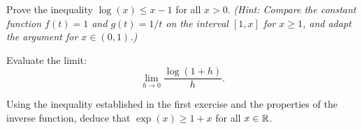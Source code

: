 \documentclass[../analysis1.tex]{subfiles}
\begin{document}
\begin{exercise*}
    Prove the inequality $\log(x) \le x - 1$ for all $x > 0$.
    \textit{(Hint: Compare the constant function $f(t) = 1$ and $g(t) = 1/t$ on the interval $[1, x]$ for $x \ge 1$, and adapt the argument for $x \in (0, 1)$.)}
\end{exercise*}

\begin{exercise*}
    Evaluate the limit:
    \[
        \lim_{h \to 0} \frac{\log(1 + h)}{h}.
    \]
\end{exercise*}

\begin{exercise*}
    Using the inequality established in the first exercise and the properties of the inverse function, deduce that $\exp(x) \ge 1 + x$ for all $x \in \mathbb{R}$.
\end{exercise*}
\end{document}
